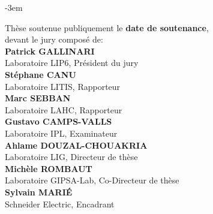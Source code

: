 \begin{titlepage}
\begin{adjustwidth}{}{-3em}
\begin{flushleft}
\begin{flushright}
\begin{minipage}{\leftshift}
\begin{flushleft}
{Thèse soutenue publiquement le \textbf{date de soutenance},\\ devant le jury composé de:}\\[\espvert]
{\textbf{Patrick GALLINARI}}\\
{Laboratoire LIP6, Président du jury}\\
{\textbf{Stéphane CANU}}\\
{Laboratoire LITIS, Rapporteur}\\
{\textbf{Marc SEBBAN}}\\
{Laboratoire LAHC, Rapporteur}\\
{\textbf{Gustavo CAMPS-VALLS}}\\
{Laboratoire IPL, Examinateur}\\
{\textbf{Ahlame DOUZAL-CHOUAKRIA}}\\
{Laboratoire LIG, Directeur de thèse}\\
{\textbf{Michèle ROMBAUT}}\\
{Laboratoire GIPSA-Lab, Co-Directeur de thèse}\\
{\textbf{Sylvain MARI\'{E}}}\\
{Schneider Electric, Encadrant}\\

\end{flushleft}
\end{minipage}
\end{flushright}
\vfill
\end{flushleft}
\end{adjustwidth}
\end{titlepage}
\setlength{\parskip}{10pt}
\endgroup

\cleardoublepage

